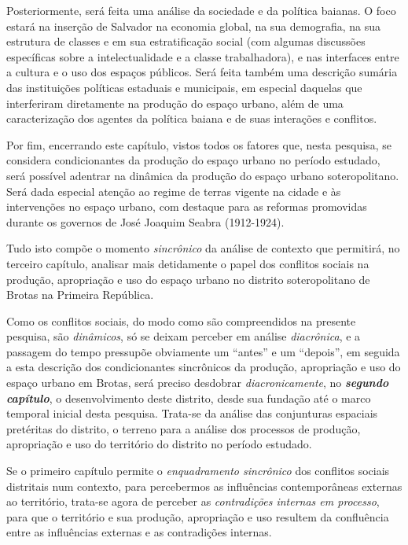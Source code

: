 Posteriormente, será feita uma análise da sociedade e da política baianas. O foco estará na inserção de Salvador na economia global, na sua demografia, na sua estrutura de classes e em sua estratificação social (com algumas discussões específicas sobre a intelectualidade e a classe trabalhadora), e nas interfaces entre a cultura e o uso dos espaços públicos. Será feita também uma descrição sumária das instituições políticas estaduais e municipais, em especial daquelas que interferiram diretamente na produção do espaço urbano, além de uma caracterização dos agentes da política baiana e de suas interações e conflitos. 

Por fim, encerrando este capítulo, vistos todos os fatores que, nesta pesquisa, se considera condicionantes da produção do espaço urbano no período estudado, será possível adentrar na dinâmica da produção do espaço urbano soteropolitano. Será dada especial atenção ao regime de terras vigente na cidade e às intervenções no espaço urbano, com destaque para as reformas promovidas durante os governos de José Joaquim Seabra (1912-1924). 

Tudo isto compõe o momento \textit{sincrônico} da análise de contexto que permitirá, no terceiro capítulo, analisar mais detidamente o papel dos conflitos sociais na produção, apropriação e uso do espaço urbano no distrito soteropolitano de Brotas na Primeira República.

Como os conflitos sociais, do modo como são compreendidos na presente pesquisa, são \textit{dinâmicos}, só se deixam perceber em análise \textit{diacrônica}, e a passagem do tempo pressupõe obviamente um ``antes'' e um ``depois'', em seguida a esta descrição dos condicionantes sincrônicos da produção, apropriação e uso do espaço urbano em Brotas, será preciso desdobrar \textit{diacronicamente}, no \textbf{\textit{segundo capítulo}}, o desenvolvimento deste distrito, desde sua fundação até o marco temporal inicial desta pesquisa. Trata-se da análise das conjunturas espaciais pretéritas do distrito, o terreno para a análise dos processos de produção, apropriação e uso do território do distrito no período estudado. 

Se o primeiro capítulo permite o \textit{enquadramento sincrônico} dos conflitos sociais distritais num contexto, para percebermos as influências contemporâneas externas ao território, trata-se agora de perceber as \textit{contradições internas em processo}, para que o território e sua produção, apropriação e uso resultem da confluência entre as influências externas e as contradições internas. 

